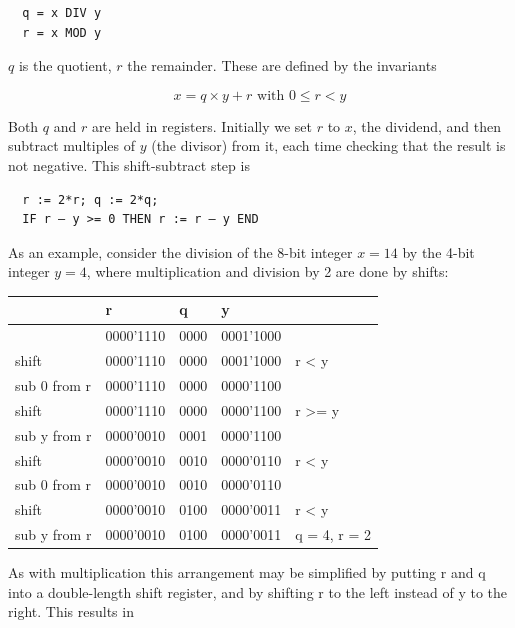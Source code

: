 \begin{verbatim}
  q = x DIV y
  r = x MOD y
\end{verbatim}

$q$ is the quotient, $r$ the remainder. These are defined by the invariants

\[ x = q×y + r\text{ with }0 \le r < y \]

Both $q$ and $r$ are held in registers. Initially we set $r$ to $x$, the dividend, and then subtract multiples
of $y$ (the divisor) from it, each time checking that the result is not negative. This shift-subtract step is

\begin{verbatim}
  r := 2*r; q := 2*q;
  IF r – y >= 0 THEN r := r – y END
\end{verbatim}

As an example, consider the division of the 8-bit integer $x = 14$ by the 4-bit integer $y = 4$, where
multiplication and division by 2 are done by shifts:

\begin{table}[h!]
  \centering
  \begin{tabular}{l l l l l}
                 & r         & q    & y         \\\hline
                 & 0000'1110 & 0000 & 0001'1000 \\
    shift        & 0000'1110 & 0000 & 0001'1000 & r < y \\
    sub 0 from r & 0000'1110 & 0000 & 0000'1100 \\ 
    shift        & 0000'1110 & 0000 & 0000'1100 & r >= y \\
    sub y from r & 0000'0010 & 0001 & 0000'1100 \\ 
    shift        & 0000'0010 & 0010 & 0000'0110 & r < y \\
    sub 0 from r & 0000'0010 & 0010 & 0000'0110 \\ 
    shift        & 0000'0010 & 0100 & 0000'0011 & r < y \\
    sub y from r & 0000'0010 & 0100 & 0000'0011 & q = 4, r = 2
  \end{tabular}
\end{table}

As with multiplication this arrangement may be simplified by putting r and q into a double-length
shift register, and by shifting r to the left instead of y to the right. This results in

